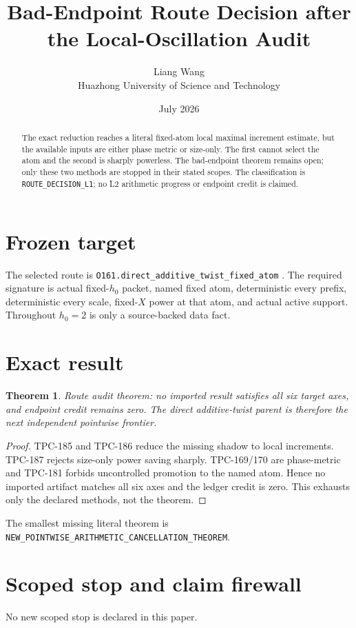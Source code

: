 \documentclass[11pt]{article}
\title{\textbf{Bad-Endpoint Route Decision after the Local-Oscillation Audit}}
\author{Liang Wang\\Huazhong University of Science and Technology}
\date{July 2026}
\newtheorem{theorem}{Theorem}
\begin{document}
\maketitle
\begin{abstract}
The exact reduction reaches a literal fixed-atom local maximal increment estimate, but the available inputs are either phase metric or size-only.  The first cannot select the atom and the second is sharply powerless.  The bad-endpoint theorem remains open; only these two methods are stopped in their stated scopes.
The classification is \texttt{ROUTE\_\allowbreak{}DECISION\_\allowbreak{}L1}; no L2 arithmetic
progress or endpoint credit is claimed.
\end{abstract}

\section{Frozen target}
The selected route is \texttt{O161.direct\_\allowbreak{}additive\_\allowbreak{}twist\_\allowbreak{}fixed\_\allowbreak{}atom} \citep{TPC182}.  The required
signature is actual fixed-$h_0$ packet, named fixed atom, deterministic every
prefix, deterministic every scale, fixed-$X$ power at that atom, and actual
active support.  Throughout $h_0=2$ is only a source-backed data fact.

\section{Exact result}
\begin{theorem}
Route audit theorem: no imported result satisfies all six target axes, and endpoint credit remains zero.  The direct additive-twist parent is therefore the next independent pointwise frontier.
\end{theorem}
\begin{proof}
TPC-185 and TPC-186 reduce the missing shadow to local increments. TPC-187 rejects size-only power saving sharply.  TPC-169/170 are phase-metric and TPC-181 forbids uncontrolled promotion to the named atom.  Hence no imported artifact matches all six axes and the ledger credit is zero.  This exhausts only the declared methods, not the theorem.
\end{proof}

The smallest missing literal theorem is
\texttt{NEW\_\allowbreak{}POINTWISE\_\allowbreak{}ARITHMETIC\_\allowbreak{}CANCELLATION\_\allowbreak{}THEOREM}.

\section{Scoped stop and claim firewall}
No new scoped stop is declared in this paper.
\end{document}
